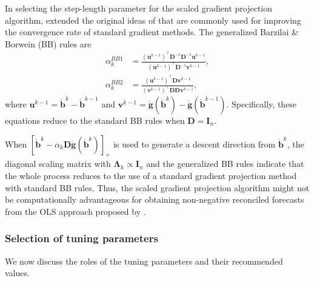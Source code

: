 \documentclass[11pt]{article}
\newcommand{\0}{\phantom{0}}
\begin{document}
In selecting the step-length parameter for the scaled gradient projection algorithm, \citet{Bonettini2009} extended the original ideas of \citet{Barzilai1988} that are commonly used for improving the convergence rate of standard gradient methods. The generalized Barzilai \& Borwein (BB) rules are
\begin{align*}
	\alpha_{k}^{BB1} & = \frac{(\bm{u}^{k-1})^\top\bm{D}^{-1} \bm{D}^{-1} \bm{u}^{k-1}}{(\bm{u}^{k-1})^\top\bm{D}^{-1}\bm{v}^{k-1}}, \\
	\alpha_{k}^{BB2} & = \frac{(\bm{u}^{k-1})^\top\bm{D}\bm{v}^{k-1}}{(\bm{v}^{k-1})^\top\bm{D}\bm{D}\bm{v}^{k-1}},
\end{align*}
where $\bm{u}^{k-1} = \mathring{\bm{b}}^{k} - \mathring{\bm{b}}^{k-1}$ and $\bm{v}^{k-1} = \mathring{\bm{g}}(\mathring{\bm{b}}^{k}) - \mathring{\bm{g}}(\mathring{\bm{b}}^{k-1})$. Specifically, these equations reduce to the standard BB rules when $\bm{D} = \bm{I}_{n}$.

When $[\mathring{\bm{b}}^{k} - \alpha_{k} \bm{D} \mathring{\bm{g}}(\mathring{\bm{b}}^{k})]_{+}$ is used to generate a descent direction from $\mathring{\bm{b}}^{k}$, the diagonal scaling matrix with $\bm{\Lambda}_{h} \propto \bm{I}_{n}$ and the generalized BB rules indicate that the whole process reduces to the use of a standard gradient projection method with standard BB rules. Thus, the scaled gradient projection algorithm might not be computationally advantageous for obtaining non-negative reconciled forecasts from the OLS approach proposed by \citet{Hyndman2011}.

\subsubsection{Selection of tuning parameters}

We now discuss the roles of the tuning parameters and their recommended values.
\end{document}
